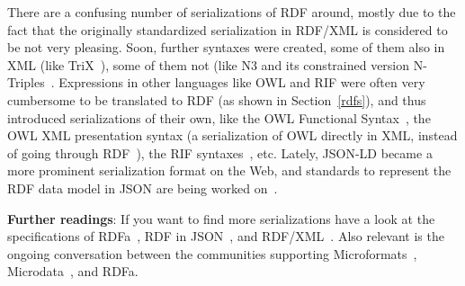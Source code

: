 There are a confusing number of serializations of RDF around, mostly due to the fact that the originally standardized serialization in RDF/XML is considered to be not very pleasing.
Soon, further syntaxes were created, some of them also in XML (like TriX~\cite{trix}), some of them not (like N3 and its constrained version N-Triples~\cite{ntriples}.
Expressions in other languages like OWL and RIF were often very cumbersome to be translated to RDF (as shown in Section~\ref{rdfs}), and thus introduced serializations of their own, like the OWL Functional Syntax~\cite{owl2}, the OWL XML presentation syntax (a serialization of OWL directly in XML, instead of going through RDF~\cite{owl3}), the RIF syntaxes~\cite{rif}, etc.
Lately, JSON-LD became a more prominent serialization format on the Web, and standards to represent the RDF data model in JSON are being worked on~\cite{json-ld}.



\medskip

\textbf{Further readings}:
If you want to find more serializations have a look at the specifications of RDFa~\cite{rdfa}, RDF in JSON~\cite{json-ld}, and RDF/XML~\cite{rdfxml}.
Also relevant is the ongoing conversation between the communities supporting Microformats~\cite{microformats}, Microdata~\cite{microdata}, and RDFa.

